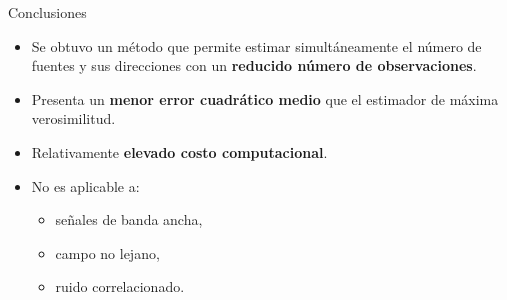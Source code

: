 \documentclass[12pt,aspectratio=169]{beamer}
\begin{document}
	\begin{frame}{Conclusiones}
		\begin{itemize}
			\item Se obtuvo un método que permite estimar simultáneamente el número de fuentes y sus direcciones con un \textbf{reducido número de observaciones}.			
			\vspace{0.1in}
			\pause
			\item Presenta un \textbf{menor error cuadrático medio} que el estimador de máxima verosimilitud.			
			\vspace{0.1in}
			\pause
			\item Relativamente \textbf{elevado costo computacional}.			
			\vspace{0.1in}
			\pause
			\item
			No es aplicable a:
			\begin{itemize}	
				\item señales de banda ancha,
				\item campo no lejano,
				\item ruido correlacionado.
			\end{itemize}
		\end{itemize}
	\end{frame}


		
\begin{frame}

		\titlepage

	\end{frame}
	
\end{document}
